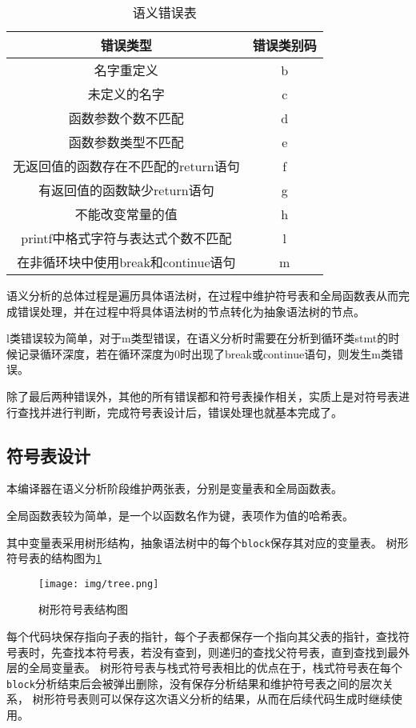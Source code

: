 \begin{table}[H] 
    \centering
    \begin{tabular}{cc}
    \toprule 
    错误类型 & 错误类别码  \\
    \midrule
    名字重定义 & b  \\
    未定义的名字 & c  \\
    函数参数个数不匹配 & d\\
    函数参数类型不匹配 & e \\
    无返回值的函数存在不匹配的return语句 & f\\
    有返回值的函数缺少return语句 & g\\
    不能改变常量的值 &h\\
    printf中格式字符与表达式个数不匹配 & l \\
    在非循环块中使用break和continue语句 & m\\
    \bottomrule %
    \end{tabular}
    \caption{语义错误表}
    \label{table:syntax}
\end{table}

语义分析的总体过程是遍历具体语法树，在过程中维护符号表和全局函数表从而完成错误处理，并在过程中将具体语法树的节点转化为抽象语法树的节点。

l类错误较为简单，对于m类型错误，在语义分析时需要在分析到循环类stmt的时候记录循环深度，若在循环深度为0时出现了break或continue语句，则发生m类错误。

除了最后两种错误外，其他的所有错误都和符号表操作相关，实质上是对符号表进行查找并进行判断，完成符号表设计后，错误处理也就基本完成了。
\subsection{符号表设计}
本编译器在语义分析阶段维护两张表，分别是变量表和全局函数表。

全局函数表较为简单，是一个以函数名作为键，表项作为值的哈希表。

其中变量表采用树形结构，抽象语法树中的每个\texttt{block}保存其对应的变量表。
树形符号表的结构图为\ref{fig:tree}
\begin{figure}[htbp]
	\centering
	\texttt{[image: img/tree.png]}
	\caption{树形符号表结构图}
	\label{fig:tree}
\end{figure}

每个代码块保存指向子表的指针，每个子表都保存一个指向其父表的指针，查找符号表时，先查找本符号表，若没有查到，则递归的查找父符号表，直到查找到最外层的全局变量表。
树形符号表与栈式符号表相比的优点在于，栈式符号表在每个\texttt{block}分析结束后会被弹出删除，没有保存分析结果和维护符号表之间的层次关系，
树形符号表则可以保存这次语义分析的结果，从而在后续代码生成时继续使用。



